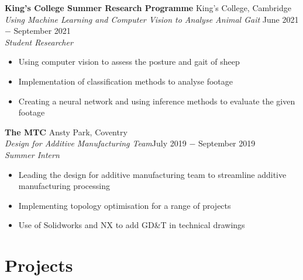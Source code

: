 \documentclass{article}
\begin{document}
\textbf{King's College Summer Research Programme} \hfill King's College, Cambridge \\
\textit{Using Machine Learning and Computer Vision to Analyse Animal Gait} \hfill June 2021 $-$ September 2021\\
\textit{Student Researcher}
\begin{itemize}
    \item {Using computer vision to assess the posture and gait of sheep}
    \item Implementation of classification methods to analyse footage
    \item {Creating a neural network and using inference methods to evaluate the given footage}
\end{itemize} \medskip

\textbf{The MTC} \hfill Ansty Park, Coventry \\
\textit{Design for Additive Manufacturing Team}\hfill July 2019 $-$ September 2019\\
\textit{Summer Intern}
\begin{itemize}
    \item {Leading the design for additive manufacturing team to streamline additive manufacturing processing}
    \item{Implementing topology optimisation for a range of projects}
    \item{Use of Solidworks and NX to add GD\&T in technical drawings}
\end{itemize} \medskip


\vspace{-.5\baselineskip}
\hrulefill
\vspace{-.5\baselineskip}

\section*{Projects}
\end{document}
